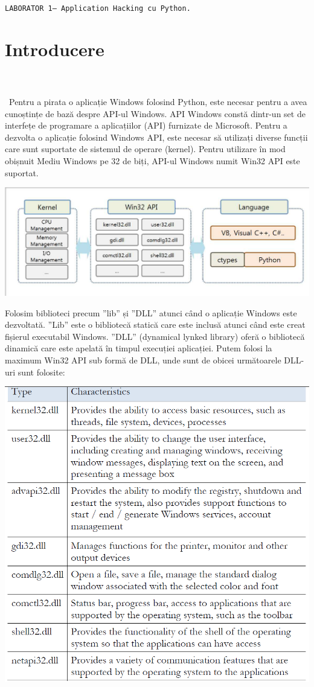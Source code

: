 \documentclass[oneside,20pt]{article}          %
\begin{document}

\noindent 
\begin{center}
  \texttt{LABORATOR 1-- Application Hacking cu Python.}        
\end{center}

\section{Introducere}
\noindent                 
\\\\\
Pentru a pirata o aplicație Windows folosind Python, este necesar
pentru a avea cunoștințe de bază despre API-ul Windows. API Windows
constă dintr-un set de interfețe de programare a aplicațiilor (API)
furnizate de Microsoft. Pentru a dezvolta o aplicație folosind
Windows API, este necesar să utilizați diverse funcții care sunt
suportate de sistemul de operare (kernel). Pentru utilizare în mod obișnuit Mediu Windows pe 32 de biți, API-ul Windows numit Win32 API este suportat.
  \begin{center}
\includegraphics[height=5 cm]{1.png}
\end{center}
Folosim biblioteci precum ”lib” și ”DLL” atunci când o aplicație Windows este
dezvoltată. ”Lib” este o bibliotecă statică care este inclusă atunci când 
este creat fișierul executabil Windows. ”DLL” (dynamical lynked library) oferă o bibliotecă dinamică care este apelată în timpul
execuției aplicației. Putem folosi la maximum Win32 API sub formă de DLL, unde sunt de obicei următoarele DLL-uri
sunt folosite:
 \begin{center}
\includegraphics[height=10 cm]{2.png}
\end{center}
\end{document}
